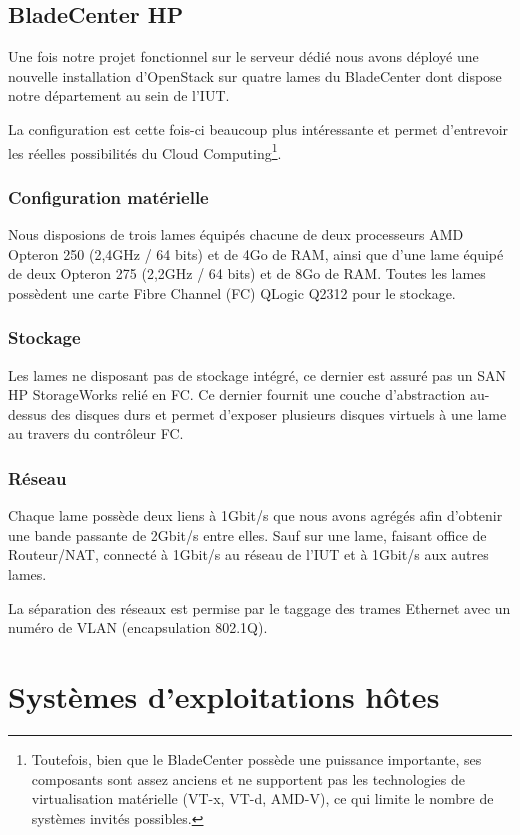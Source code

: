 \documentclass{report}
\begin{document}
\section{BladeCenter HP}
Une fois notre projet fonctionnel sur le serveur dédié nous avons déployé une nouvelle installation d'OpenStack sur quatre lames du BladeCenter dont dispose notre département au sein de l'IUT.

La configuration est cette fois-ci beaucoup plus intéressante et permet d'entrevoir les réelles possibilités du Cloud Computing\footnote{Toutefois, bien que le BladeCenter possède une puissance importante, ses composants sont assez anciens et ne supportent pas les technologies de virtualisation matérielle (VT-x, VT-d, AMD-V), ce qui limite le nombre de systèmes invités possibles.}.

\subsection{Configuration matérielle}
Nous disposions de trois lames équipés chacune de deux processeurs AMD Opteron 250 (2,4GHz / 64 bits) et de 4Go de RAM, ainsi que d'une lame équipé de deux Opteron 275 (2,2GHz / 64 bits) et de 8Go de RAM.\newline
Toutes les lames possèdent une carte Fibre Channel (FC) QLogic Q2312 pour le stockage.

\subsection{Stockage}
Les lames ne disposant pas de stockage intégré, ce dernier est assuré pas un SAN HP StorageWorks relié en FC. Ce dernier fournit une couche d'abstraction au-dessus des disques durs et permet d'exposer plusieurs disques \og virtuels \fg à une lame au travers du contrôleur FC.

\subsection{Réseau}
Chaque lame possède deux liens à 1Gbit/s que nous avons agrégés afin d'obtenir une bande passante de 2Gbit/s entre elles. Sauf sur une lame, faisant office de Routeur/NAT, connecté à 1Gbit/s au réseau de l'IUT et à 1Gbit/s aux autres lames.

La séparation des réseaux est permise par le taggage des trames Ethernet avec un numéro de VLAN (encapsulation 802.1Q).


\chapter{Systèmes d'exploitations hôtes}
\end{document}
